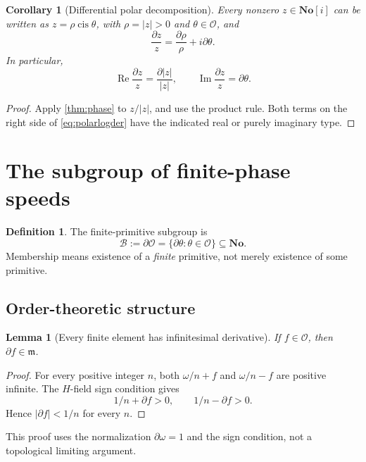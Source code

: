 \documentclass[11pt,a4paper]{article}
\newtheorem{lemma}[theorem]{Lemma}
\newtheorem{corollary}[theorem]{Corollary}
\theoremstyle{definition}
\newtheorem{definition}[theorem]{Definition}
\newcommand{\No}{\mathbf{No}}
\newcommand{\SC}{\mathbf{No}[i]}
\newcommand{\D}{\partial}
\newcommand{\OO}{\mathcal O}
\newcommand{\mm}{\mathfrak m}
\newcommand{\BB}{\mathcal B}
\newcommand{\cis}{\operatorname{cis}}
\newcommand{\Real}{\operatorname{Re}}
\newcommand{\Imag}{\operatorname{Im}}
\numberwithin{equation}{section}
\begin{document}
\begin{corollary}[Differential polar decomposition]\label{cor:polar}
Every nonzero $z\in\SC$ can be written as
$z=\rho\cis\theta$, with $\rho=|z|>0$ and $\theta\in\OO$, and
\begin{equation}\label{eq:polarlogder}
 \frac{\D z}{z}=\frac{\D\rho}{\rho}+i\D\theta.
\end{equation}
In particular,
\[
 \Real\frac{\D z}{z}=\frac{\D|z|}{|z|},\qquad
 \Imag\frac{\D z}{z}=\D\theta.
\]
\end{corollary}
\begin{proof}
Apply \cref{thm:phase} to $z/|z|$, and use the product rule. Both terms
on the right side of \eqref{eq:polarlogder} have the indicated real or
purely imaginary type.
\end{proof}

\section{The subgroup of finite-phase speeds}\label{sec:bounded}

\begin{definition}\label{def:B}
The finite-primitive subgroup is
\[
 \BB:=\D\OO=\{\D\theta:\theta\in\OO\}\subseteq\No.
\]
Membership means existence of a \emph{finite} primitive, not merely
existence of some primitive.
\end{definition}

\subsection{Order-theoretic structure}
\begin{lemma}[Every finite element has infinitesimal derivative]
\label{lem:smallness}
If $f\in\OO$, then $\D f\in\mm$.
\end{lemma}
\begin{proof}
For every positive integer $n$, both $\omega/n+f$ and $\omega/n-f$
are positive infinite. The $H$-field sign condition gives
\[
 1/n+\D f>0,\qquad1/n-\D f>0.
\]
Hence $|\D f|<1/n$ for every $n$.
\end{proof}
This proof uses the normalization $\D\omega=1$ and the sign condition,
not a topological limiting argument.
\end{document}
